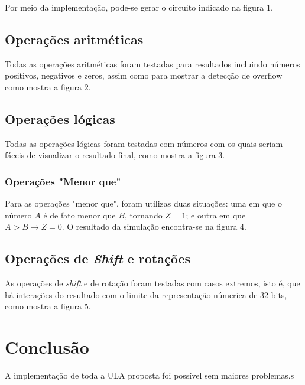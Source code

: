 \documentclass[12pt, a4paper, twoside]{article}
\begin{document}
Por meio da implementação, pode-se gerar o circuito indicado na figura 1.


\subsection{Operações aritméticas}

Todas as operações aritméticas foram testadas para resultados incluindo
números positivos, negativos e zeros, assim como para mostrar a detecção de
overflow como mostra a figura 2.


\subsection{Operações lógicas}

Todas as operações lógicas foram testadas com números com os quais seriam
fáceis de visualizar o resultado final, como mostra a figura 3.


\subsubsection{Operações "Menor que"}

Para as operações "menor que", foram utilizas duas situações: uma em que
o número $A$ é de fato menor que $B$, tornando $Z=1$; e outra em que
$A>B \rightarrow Z=0$. O resultado da simulação encontra-se na figura 4.


\subsection{Operações de \textit{Shift} e rotações}

As operações de \textit{shift} e de rotação foram testadas com casos
extremos, isto é, que há interações do resultado com o limite da representação
númerica de 32 bits, como mostra a figura 5.


\section{Conclusão}

A implementação de toda a ULA proposta foi possível sem maiores problemas.s
\end{document}
